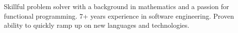 

\begin{cvparagraph}

Skillful problem solver with a background in mathematics and a passion for
  functional programming.  7+ years experience in
  software engineering.  Proven ability to quickly ramp up on new
  languages and technologies.
\end{cvparagraph}
